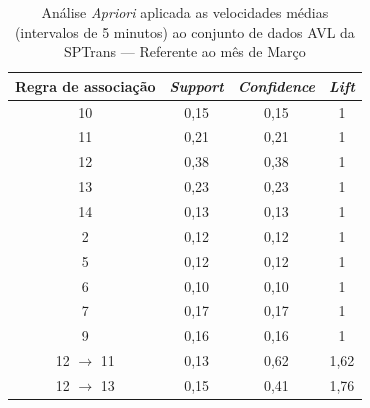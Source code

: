 \documentclass[
	12pt,				%
	oneside,			%
	a4paper,			%
	english,			%
	brazil				%
	]{abntex2ppgsi}
\begin{document}
{{{\begin{apendicesenv}
\begin{table}[!htb]
\centering
\caption {Análise \textit{Apriori} aplicada as velocidades médias (intervalos de 5 minutos) ao conjunto de dados AVL da SPTrans --- Referente ao mês de Março}
\label {tab:aprioriMarch}
\begin{tabular}{c|c|c|c}
\toprule
\textbf{Regra de associação} & \textit{\textbf{Support}} & \textit{\textbf{Confidence}} & \textit{\textbf{Lift}} \\
\midrule 
10 &  0,15 &  0,15 &  1\\ 
\hline 
11 &  0,21 &  0,21 &  1\\ 
\hline 
12 &  0,38 &  0,38 &  1\\ 
\hline 
13 &  0,23 &  0,23 &  1\\ 
\hline 
14 &  0,13 &  0,13 &  1\\ 
\hline 
2 &  0,12 &  0,12 &  1\\ 
\hline 
5 &  0,12 &  0,12 &  1\\ 
\hline 
6 &  0,10 &  0,10 &  1\\ 
\hline 
7 &  0,17 &  0,17 &  1\\ 
\hline 
9 &  0,16 &  0,16 &  1\\ 
\hline 
12 $\rightarrow$ 11 &  0,13 &  0,62 &  1,62\\ 
\hline 
12 $\rightarrow$ 13 &  0,15 &  0,41 &  1,76\\
\bottomrule
\end{tabular}
\end{table}



\end{apendicesenv}}}}
\end{document}
